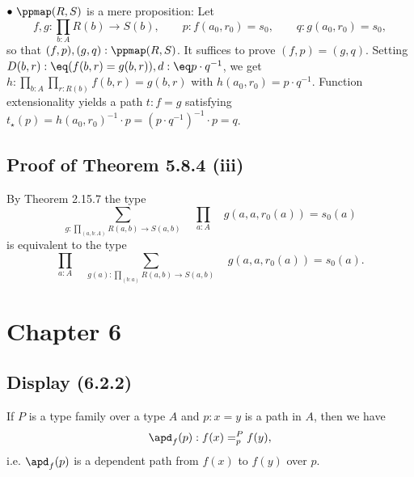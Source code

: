 \documentclass[12pt]{article}
\begin{document}
\nn$\bullet\ \ppmap(R,S)$ is a mere proposition: Let 
$$
f,g:\prod_{b:A}R(b)\to S(b),\qquad p:f(a_0,r_0)=s_0,\qquad q:g(a_0,r_0)=s_0,
$$ 
so that $(f,p),(g,q):\ppmap(R,S)$. It suffices to prove $(f,p)=(g,q)$. Setting $D(b,r):\eq(f(b,r)=g(b,r)),d:\eq p\cdot q^{-1}$, we get $h:\prod_{b:A}\prod_{r:R(b)}f(b,r)=g(b,r)$ with $h(a_0,r_0)=p\cdot q^{-1}$. Function extensionality yields a path $t:f=g$ satisfying $t_\star(p)=h(a_0,r_0)^{-1}\cdot p=(p\cdot q^{-1})^{-1}\cdot p=q$.%


\subsection{Proof of Theorem 5.8.4 (iii)}

By Theorem 2.15.7 the type 
$$
\sum_{g:\prod_{(a,b:A)}R(a,b)\to S(a,b)}\quad\prod_{a:A}\quad g(a,a,r_0(a))=s_0(a)
$$ 
is equivalent to the type
$$
\prod_{a:A}\quad\sum_{g(a):\prod_{(b:a)}R(a,b)\to S(a,b)}\quad g(a,a,r_0(a))=s_0(a).
$$






\section{Chapter 6}

\subsection{Display (6.2.2)}

If $P$ is a type family over a type $A$ and $p:x=y$ is a path in $A$, then we have 
$$
\apd_f(p):f(x)=^P_pf(y),
$$ 
i.e. $\apd_f(p)$ is a dependent path from $f(x)$ to $f(y)$ over $p$.

\end{document}
